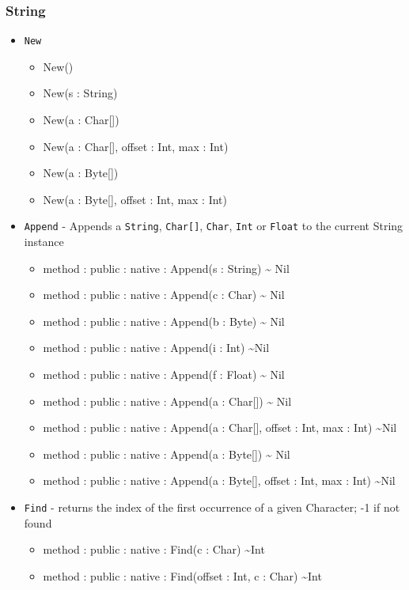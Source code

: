 \documentclass[11pt]{article}
\begin{document}
\subsubsection{String}
\begin{itemize}
\item \texttt{New}
  \begin{itemize}
  \item New()
  \item New(s : String)
  \item New(a : Char[])
  \item New(a : Char[], offset : Int, max : Int)
  \item New(a : Byte[])
  \item New(a : Byte[], offset : Int, max : Int)
  \end{itemize}
\item \texttt{Append} - Appends a \texttt{String}, \texttt{Char[]},
  \texttt{Char}, \texttt{Int} or \texttt{Float} to the current String
  instance
  \begin{itemize}
  \item method : public : native : Append(s : String) \textasciitilde
    Nil
  \item method : public : native : Append(c : Char) \textasciitilde
    Nil
  \item method : public : native : Append(b : Byte) \textasciitilde
    Nil
  \item method : public : native : Append(i : Int) \textasciitilde Nil
  \item method : public : native : Append(f : Float) \textasciitilde
    Nil
  \item method : public : native : Append(a : Char[]) \textasciitilde
    Nil
  \item method : public : native : Append(a : Char[], offset : Int,
    max : Int) \textasciitilde Nil
  \item method : public : native : Append(a : Byte[]) \textasciitilde
    Nil
  \item method : public : native : Append(a : Byte[], offset : Int,
    max : Int) \textasciitilde Nil
  \end{itemize}
\item \texttt{Find} - returns the index of the first occurrence of a
  given Character; -1 if not found
  \begin{itemize}
  \item method : public : native : Find(c : Char) \textasciitilde Int
  \item method : public : native : Find(offset : Int, c : Char) \textasciitilde Int

\end{itemize}
\end{itemize}
\end{document}

